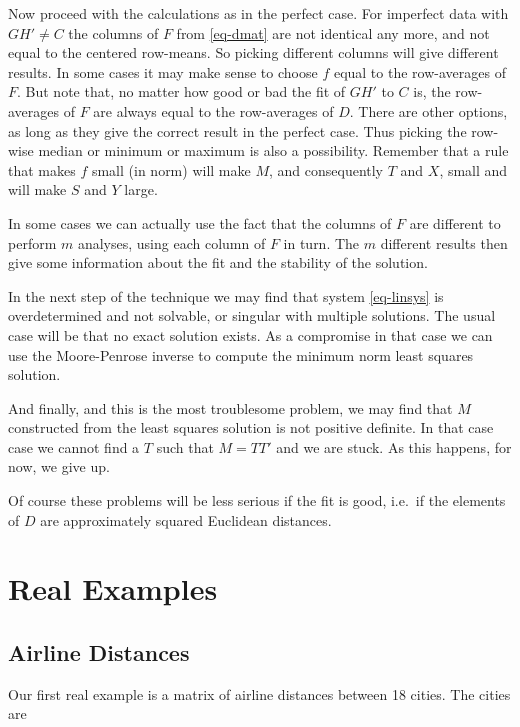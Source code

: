 \documentclass[
  12pt,
  letterpaper,
  DIV=11,
  numbers=noendperiod]{scrartcl}
\newcommand{\sectionbreak}{\clearpage}
\begin{document}
Now proceed with the calculations as in the perfect case. For imperfect
data with \(GH' \neq C\) the columns of \(F\) from \eqref{eq-dmat} are
not identical any more, and not equal to the centered row-means. So
picking different columns will give different results. In some cases it
may make sense to choose \(f\) equal to the row-averages of \(F\). But
note that, no matter how good or bad the fit of \(GH'\) to \(C\) is, the
row-averages of \(F\) are always equal to the row-averages of \(D\).
There are other options, as long as they give the correct result in the
perfect case. Thus picking the row-wise median or minimum or maximum is
also a possibility. Remember that a rule that makes \(f\) small (in
norm) will make \(M\), and consequently \(T\) and \(X\), small and will
make \(S\) and \(Y\) large.

In some cases we can actually use the fact that the columns of \(F\) are
different to perform \(m\) analyses, using each column of \(F\) in turn.
The \(m\) different results then give some information about the fit and
the stability of the solution.

In the next step of the technique we may find that system
\eqref{eq-linsys} is overdetermined and not solvable, or singular with
multiple solutions. The usual case will be that no exact solution
exists. As a compromise in that case we can use the Moore-Penrose
inverse to compute the minimum norm least squares solution.

And finally, and this is the most troublesome problem, we may find that
\(M\) constructed from the least squares solution is not positive
definite. In that case case we cannot find a \(T\) such that \(M = TT'\)
and we are stuck. As this happens, for now, we give up.

Of course these problems will be less serious if the fit is good,
i.e.~if the elements of \(D\) are approximately squared Euclidean
distances.

\sectionbreak

\section{Real Examples}\label{real-examples}

\subsection{Airline Distances}\label{airline-distances}

Our first real example is a matrix of airline distances between 18
cities. The cities are
\end{document}
